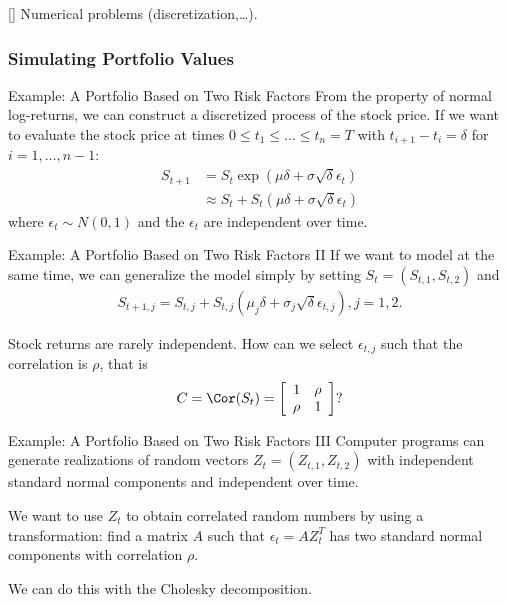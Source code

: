 	[\textendash\hspace{1px}] Numerical problems (discretization,\ldots).


\subsubsection{Simulating Portfolio Values}

Example: A Portfolio Based on Two Risk Factors
	From the property of normal log-returns, we can construct a discretized process
	of the stock price. If we want to evaluate the stock price at times $0 \leq t_1
	\leq \ldots \leq t_n=T$ with $t_{i+1}-t_i=\delta$ for $i=1,\ldots,n-1$:
		\begin{align*}
			S_{t+1} &= S_t \exp\left( \mu \delta + \sigma \sqrt{\delta} \epsilon_t
			\right)\\
			&\approx S_{t} + S_{t} \left( \mu \delta + \sigma
			\sqrt{\delta} \epsilon_{t} \right)
		\end{align*}
	where $\epsilon_t\sim N(0,1)$ and the $\epsilon_t$ are independent over time.


Example: A Portfolio Based on Two Risk Factors II
	If we want to model at the same time, we can generalize the model simply by
	setting $S_{t}=(S_{t,1},S_{t,2})$ and
		\begin{align*}
			S_{t+1,j} = S_{t,j} + S_{t,j} \left( \mu_j \delta + \sigma_j
			\sqrt{\delta} \epsilon_{t,j} \right), j=1,2.
		\end{align*}

	Stock returns are rarely independent. How can we select $\epsilon_{t,j}$ such
	that the correlation is $\rho$, that is
		\begin{align*}
		C= \Cor(S_{t}) = \left[ \begin{array}{cc}1 & \rho \\ \rho &1 
		\end{array}\right] ?
		\end{align*}


Example: A Portfolio Based on Two Risk Factors III
	Computer programs can generate realizations of random vectors
	$Z_t=(Z_{t,1},Z_{t,2})$ with independent standard normal components and
	independent over time.
  
	We want to use $Z_t$ to obtain correlated random numbers by using a
	transformation: find a matrix $A$ such that $\epsilon_t=AZ^T_t$ has two
	standard normal components with correlation $\rho$.
  
	We can do this with the Cholesky decomposition. 


